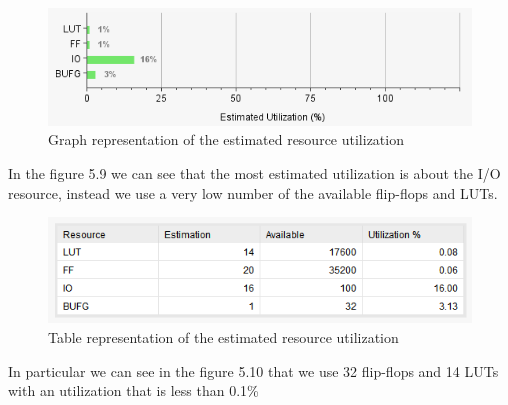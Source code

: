 \documentclass[a4paper]{report}
\begin{document}
\begin{figure}[htpb]
	\centering
	\includegraphics[scale=0.9]{img/vivado/estimated_utilization1.png}
	\caption{Graph representation of the estimated resource utilization}
\end{figure}


\noindent In the figure 5.9 we can see that the most estimated utilization is about the I/O resource, instead we use a very low number of the available flip-flops and LUTs.

\begin{figure}[htpb]
	\centering
	\includegraphics[scale=0.9]{img/vivado/estimated_utilization2.png}
	\caption{Table representation of the estimated resource utilization}
\end{figure}


\noindent In particular we can see in the figure 5.10 that we use 32 flip-flops and 14 LUTs with an utilization that is less than 0.1\%
\end{document}
